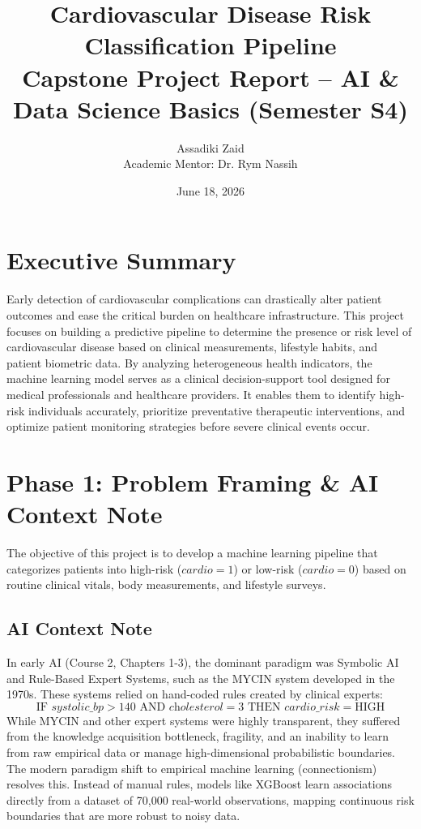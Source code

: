 \documentclass[11pt,a4paper]{article}
\title{
    \textbf{Cardiovascular Disease Risk Classification Pipeline}\\
    \large Capstone Project Report -- AI \& Data Science Basics (Semester S4)
}
\author{Assadiki Zaid\\ Academic Mentor: Dr. Rym Nassih}
\date{June 18, 2026}
\begin{document}
\maketitle
\thispagestyle{empty}
\newpage

\tableofcontents
\newpage


\section{Executive Summary}
Early detection of cardiovascular complications can drastically alter patient outcomes and ease the critical burden on healthcare infrastructure. This project focuses on building a predictive pipeline to determine the presence or risk level of cardiovascular disease based on clinical measurements, lifestyle habits, and patient biometric data. By analyzing heterogeneous health indicators, the machine learning model serves as a clinical decision-support tool designed for medical professionals and healthcare providers. It enables them to identify high-risk individuals accurately, prioritize preventative therapeutic interventions, and optimize patient monitoring strategies before severe clinical events occur.

\section{Phase 1: Problem Framing \& AI Context Note}
The objective of this project is to develop a machine learning pipeline that categorizes patients into high-risk ($cardio=1$) or low-risk ($cardio=0$) based on routine clinical vitals, body measurements, and lifestyle surveys. 

\subsection{AI Context Note}
In early AI (Course 2, Chapters 1-3), the dominant paradigm was Symbolic AI and Rule-Based Expert Systems, such as the MYCIN system developed in the 1970s. These systems relied on hand-coded rules created by clinical experts:
\begin{equation}
\text{IF } \textit{systolic\_bp} > 140 \text{ AND } \textit{cholesterol} = 3 \text{ THEN } \textit{cardio\_risk} = \text{HIGH}
\end{equation}
While MYCIN and other expert systems were highly transparent, they suffered from the knowledge acquisition bottleneck, fragility, and an inability to learn from raw empirical data or manage high-dimensional probabilistic boundaries. The modern paradigm shift to empirical machine learning (connectionism) resolves this. Instead of manual rules, models like XGBoost learn associations directly from a dataset of 70,000 real-world observations, mapping continuous risk boundaries that are more robust to noisy data.
\end{document}
